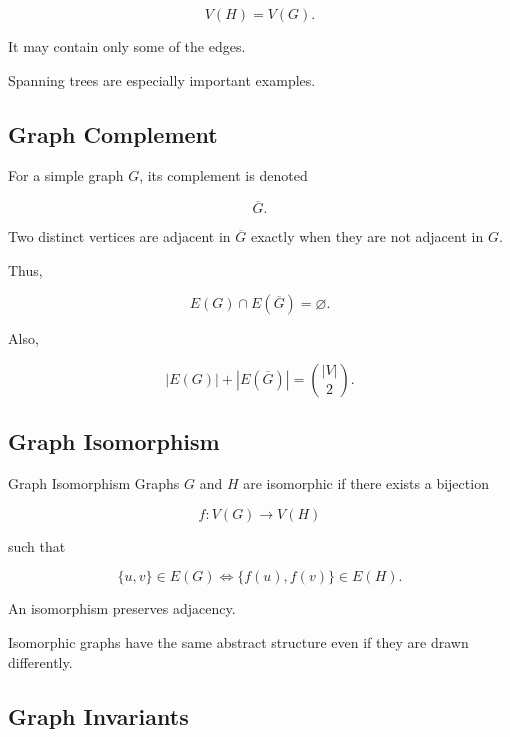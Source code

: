 \[
V(H)=V(G).
\]

It may contain only some of the edges.

Spanning trees are especially important examples.

\subsection{Graph Complement}
\label{subsec:graph-complement}

For a simple graph \(G\), its complement is denoted

\[
\boxed{
\overline{G}.
}
\]

Two distinct vertices are adjacent in \(\overline{G}\) exactly when
they are not adjacent in \(G\).

Thus,

\[
\boxed{
E(G)\cap E(\overline{G})=\varnothing.
}
\]

Also,

\[
\boxed{
|E(G)|+|E(\overline{G})|
=
\binom{|V|}{2}.
}
\]

\subsection{Graph Isomorphism}
\label{subsec:graph-isomorphism}

\begin{definitionbox}{Graph Isomorphism}
Graphs \(G\) and \(H\) are isomorphic if there exists a bijection

\[
f:V(G)\to V(H)
\]

such that

\[
\boxed{
\{u,v\}\in E(G)
\iff
\{f(u),f(v)\}\in E(H).
}
\]
\end{definitionbox}

An isomorphism preserves adjacency.

Isomorphic graphs have the same abstract structure even if they are
drawn differently.

\subsection{Graph Invariants}
\label{subsec:graph-invariants}

